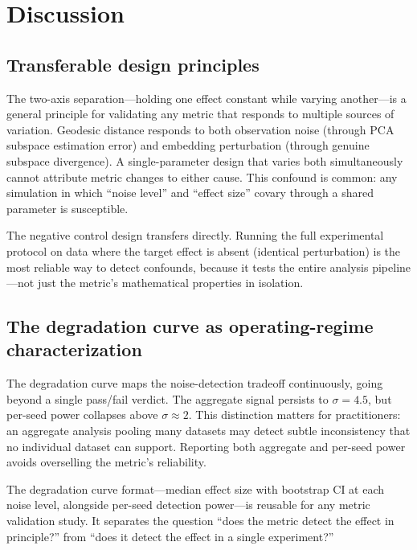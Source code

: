 \documentclass[11pt]{article}
\begin{document}
\section{Discussion}
\label{sec:discussion}

\subsection{Transferable design principles}

The two-axis separation---holding one effect constant while varying
another---is a general principle for validating any metric that
responds to multiple sources of variation.  Geodesic distance
responds to both observation noise (through PCA subspace
estimation error) and embedding perturbation (through genuine
subspace divergence).  A single-parameter design that varies both
simultaneously cannot attribute metric changes to either cause.
This confound is common: any simulation in which ``noise
level'' and ``effect size'' covary through a shared parameter is
susceptible.

The negative control design transfers directly.  Running the full
experimental protocol on data where the target effect is absent
(identical perturbation) is the most reliable way to detect
confounds, because it tests the entire analysis pipeline---not
just the metric's mathematical properties in isolation.

\subsection{The degradation curve as operating-regime
  characterization}

The degradation curve maps the noise-detection tradeoff
continuously, going beyond a single pass/fail verdict.  The
aggregate signal persists to $\sigma = 4.5$, but per-seed power
collapses above $\sigma \approx 2$.  This distinction matters for
practitioners: an aggregate analysis pooling many datasets may
detect subtle inconsistency that no individual dataset can support.
Reporting both aggregate and per-seed power avoids overselling
the metric's reliability.

The degradation curve format---median effect size with bootstrap CI
at each noise level, alongside per-seed detection power---is
reusable for any metric validation study.  It separates the
question ``does the metric detect the effect in principle?'' from
``does it detect the effect in a single experiment?''
\end{document}
